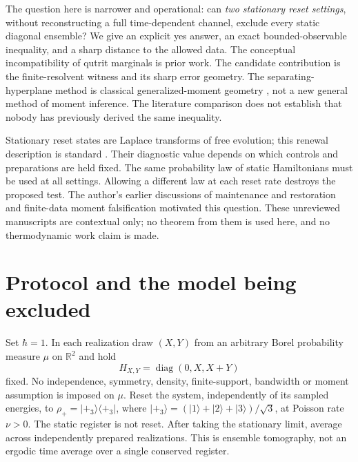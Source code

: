 \documentclass[11pt,a4paper]{article}
\newcommand{\R}{\mathbb R}
\newcommand{\diag}{\operatorname{diag}}
\begin{document}
The question here is narrower and operational: can \emph{two stationary
reset settings}, without reconstructing a full time-dependent channel,
exclude every static diagonal ensemble? We give an explicit yes answer,
an exact bounded-observable inequality, and a sharp distance to the
allowed data. The conceptual incompatibility of qutrit marginals is
prior work. The candidate contribution is the finite-resolvent witness
and its sharp error geometry. The separating-hyperplane method is
classical generalized-moment geometry \cite{kemperman}, not a new
general method of moment inference. The literature comparison does not
establish that nobody has previously derived the same inequality.

Stationary reset states are Laplace transforms of free evolution; this
renewal description is standard \cite{rose}. Their diagnostic value
depends on which controls and preparations are held fixed. The same
probability law of static Hamiltonians must be used at all settings.
Allowing a different law at each reset rate destroys the proposed test.
The author's earlier discussions of maintenance and restoration
\cite{eriksson-maintenance} and finite-data moment falsification
\cite{eriksson-moments} motivated this question. These unreviewed
manuscripts are contextual only; no theorem from them is used here,
and no thermodynamic work claim is made.

\section{Protocol and the model being excluded}
Set $\hbar=1$. In each realization draw $(X,Y)$ from an arbitrary Borel
probability measure $\mu$ on $\R^2$ and hold
\begin{equation}\label{eq:H}
 H_{X,Y}=\diag(0,X,X+Y)
\end{equation}
fixed. No independence, symmetry, density, finite-support, bandwidth or
moment assumption is imposed on $\mu$.
Reset the system, independently of its sampled energies, to
$\rho_+=|+_3\rangle\langle+_3|$, where
$|+_3\rangle=(|1\rangle+|2\rangle+|3\rangle)/\sqrt3$, at Poisson
rate $\nu>0$. The static register is not reset. After taking the
stationary limit, average across independently prepared realizations.
This is ensemble tomography, not an ergodic time average over a single
conserved register.
\end{document}
